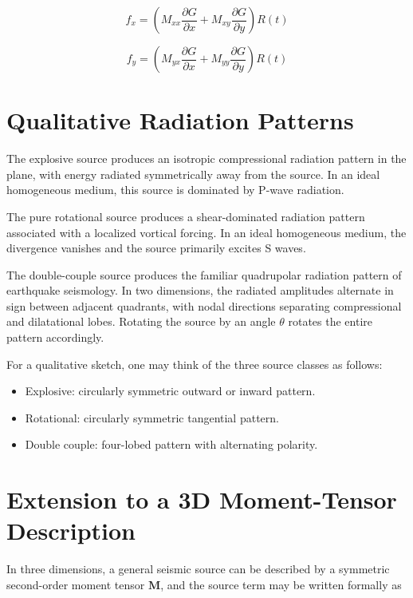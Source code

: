 \documentclass[11pt]{article}
\begin{document}
\begin{equation}
f_x = \left(M_{xx}\frac{\partial G}{\partial x} + M_{xy}\frac{\partial G}{\partial y}\right) R(t)
\end{equation}

\begin{equation}
f_y = \left(M_{yx}\frac{\partial G}{\partial x} + M_{yy}\frac{\partial G}{\partial y}\right) R(t)
\end{equation}

\section{Qualitative Radiation Patterns}

The explosive source produces an isotropic compressional radiation pattern in the plane, with energy radiated symmetrically away from the source. In an ideal homogeneous medium, this source is dominated by P-wave radiation.

The pure rotational source produces a shear-dominated radiation pattern associated with a localized vortical forcing. In an ideal homogeneous medium, the divergence vanishes and the source primarily excites S waves.

The double-couple source produces the familiar quadrupolar radiation pattern of earthquake seismology. In two dimensions, the radiated amplitudes alternate in sign between adjacent quadrants, with nodal directions separating compressional and dilatational lobes. Rotating the source by an angle $\theta$ rotates the entire pattern accordingly.

For a qualitative sketch, one may think of the three source classes as follows:
\begin{itemize}
\item Explosive: circularly symmetric outward or inward pattern.
\item Rotational: circularly symmetric tangential pattern.
\item Double couple: four-lobed pattern with alternating polarity.
\end{itemize}

\section{Extension to a 3D Moment-Tensor Description}

In three dimensions, a general seismic source can be described by a symmetric second-order moment tensor $\bm{M}$, and the source term may be written formally as
\end{document}
